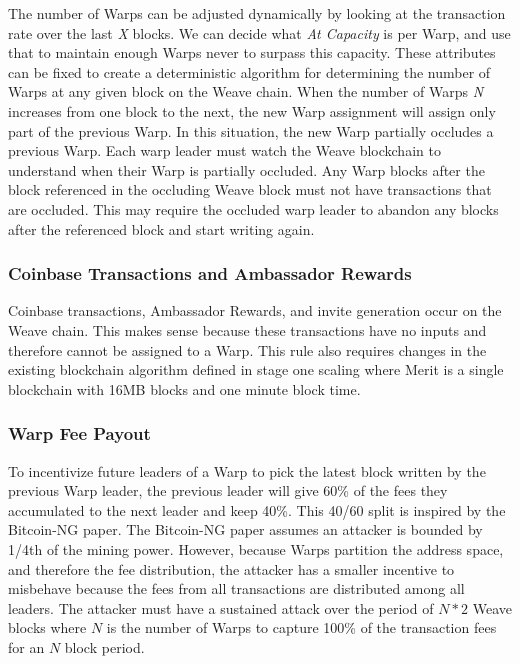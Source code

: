 \documentclass{article}
\begin{document}
The number of Warps can be adjusted dynamically by looking at the transaction
rate over the last \emph{X} blocks. We can decide what \emph{At Capacity} is per
Warp, and use that to maintain enough Warps never to surpass this capacity. These
attributes can be fixed to create a deterministic algorithm for determining the
number of Warps at any given block on the Weave chain. When the number of Warps 
\emph{N} increases from one block to the next, the new Warp assignment will assign
only part of the previous Warp. In this situation, the new Warp partially occludes
a previous Warp. Each warp leader must watch the Weave blockchain to understand 
when their Warp is partially occluded. Any Warp blocks after the block referenced
in the occluding Weave block must not have transactions that are occluded. This
may require the occluded warp leader to abandon any blocks after the referenced
block and start writing again.

\subsubsection{Coinbase Transactions and Ambassador Rewards}

Coinbase transactions, Ambassador Rewards, and invite generation occur on the
Weave chain. This makes sense because these transactions have no inputs and
therefore cannot be assigned to a Warp. This rule also requires changes in the
existing blockchain algorithm defined in stage one scaling where Merit is a single
blockchain with 16MB blocks and one minute block time.

\subsubsection{Warp Fee Payout}

To incentivize future leaders of a Warp to pick the latest block written
by the previous Warp leader, the previous leader will give 60\% of the fees they
accumulated to the next leader and keep 40\%. This 40/60 split is inspired by
the Bitcoin-NG \cite{bitcoinng} paper. The Bitcoin-NG paper assumes an attacker
is bounded by 1/4th of the mining power. However, because Warps partition the
address space, and therefore the fee distribution, the attacker has a smaller
incentive to misbehave because the fees from all transactions are distributed
among all leaders. The attacker must have a sustained attack over the period of
$N*2$ Weave blocks where $N$ is the number of Warps to capture 100\% of the
transaction fees for an $N$ block period.
\end{document}
